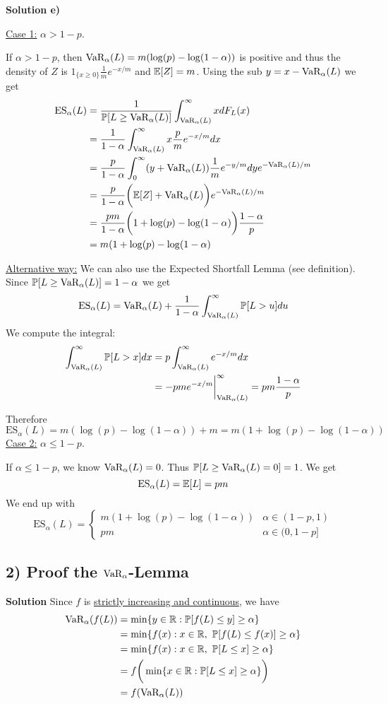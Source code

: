 \textbf{Solution e)} 

\underline{Case 1:} $\alpha > 1 - p$.

If $\alpha > 1-p$, then $\text{VaR}_\alpha(L) = m(\log(p)-\log(1-\alpha))$ is positive and thus the density of $Z$ is $1_{\{x\geq 0\}}\frac{1}{m}e^{-x/m}$ and $\mathbb{E}[Z] = m$. Using the sub $y = x - \text{VaR}_\alpha(L)$ we get
\begin{align*}
    \text{ES}_\alpha(L) &= \frac{1}{\mathbb{P}[L \geq \text{VaR}_\alpha(L)]}\int_{\text{VaR}_\alpha(L)}^\infty
    x dF_L(x) \\
    &= \frac{1}{1-\alpha}\int_{\text{VaR}_\alpha(L)}^\infty x \frac{p}{m} e^{-x/m} dx \\
    &= \frac{p}{1-\alpha} \int_0^\infty (y + \text{VaR}_\alpha(L))\frac{1}{m}e^{-y/m}dy e^{-\text{VaR}_\alpha(L)/m} \\
    &= \frac{p}{1-\alpha}\bigg(\mathbb{E}[Z] + \text{VaR}_\alpha(L)\bigg) e^{-\text{VaR}_\alpha(L)/m} \\
    &= \frac{pm}{1-\alpha}\bigg( 1 + \log(p) - \log(1-\alpha)\bigg)\frac{1-\alpha}{p} \\
    &= m(1 + \log(p) - \log(1 - \alpha)
\end{align*}

\underline{Alternative way:} We can also use the Expected Shortfall Lemma (see definition). Since $\mathbb{P}[L \geq \text{VaR}_\alpha(L)] = 1 - \alpha$ we get
\[
    \text{ES}_\alpha (L) = \text{VaR}_\alpha(L) + \frac{1}{1-\alpha}\int_{\text{VaR}_\alpha(L)}^\infty \mathbb{P}[L > u]du
\]
We compute the integral:
\begin{align*}
    \int_{\text{VaR}_\alpha(L)}^\infty \mathbb{P}[L > x]dx &= p\int_{\text{VaR}_\alpha(L)}^\infty e^{-x/m}dx \\
    &= -pme^{-x/m}\bigg|_{\text{VaR}_\alpha(L)}^\infty = pm\frac{1-\alpha}{p}
\end{align*}

Therefore
\[
    \text{ES}_\alpha(L) = m(\log(p) - \log(1-\alpha)) + m = m(1 + \log(p) - \log(1-\alpha))
\]
\underline{Case 2:} $\alpha \leq 1 - p$.

If $\alpha \leq 1 - p$, we know $\text{VaR}_\alpha(L) = 0$. Thus $\mathbb{P}[L \geq \text{VaR}_\alpha(L) = 0] = 1$. We get
\[
    \text{ES}_\alpha(L) = \mathbb{E}[L] = pm
\]
We end up with
\[
    \text{ES}_\alpha(L) =
    \begin{cases}
            m(1 + \log(p) - \log(1-\alpha)) & \alpha \in (1-p,1) \\
            pm & \alpha \in (0, 1-p]
    \end{cases}
\]

%
%
\subsection*{2) Proof the $\text{VaR}_\alpha$-Lemma}
\textbf{Solution} Since $f$ is \underline{strictly increasing and continuous}, we have
\begin{align*}
    \text{VaR}_\alpha(f(L)) &= \min\{ y \in \mathbb{R} : \mathbb{P}[f(L) \leq y] \geq \alpha\} \\
              &= \min\{f(x) : x\in\mathbb{R}, \ \mathbb{P}[f(L) \leq f(x)] \geq \alpha\} \\
              &= \min\{f(x) : x\in\mathbb{R}, \ \mathbb{P}[L \leq x] \geq \alpha\} \\
              &= f\bigg(\min\{x\in\mathbb{R} : \mathbb{P}[L \leq x] \geq \alpha\}\bigg) \\
              &= f(\text{VaR}_\alpha(L))
\end{align*}


